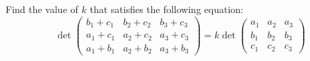 \begin{exercise} \label{exercise 4.2.4}
Find the value of \(k\) that satisfies the following equation:
\[
    \det\left(\begin{array}{lll}
        b_{1}+c_{1} & b_{2}+c_{2} & b_{3}+c_{3} \\
        a_{1}+c_{1} & a_{2}+c_{2} & a_{3}+c_{3} \\
        a_{1}+b_{1} & a_{2}+b_{2} & a_{3}+b_{3}
    \end{array}\right) =
    k \det\left(\begin{array}{ccc}
        a_{1} & a_{2} & a_{3} \\
        b_{1} & b_{2} & b_{3} \\
        c_{1} & c_{2} & c_{3}
    \end{array}\right)
\]
\end{exercise}

